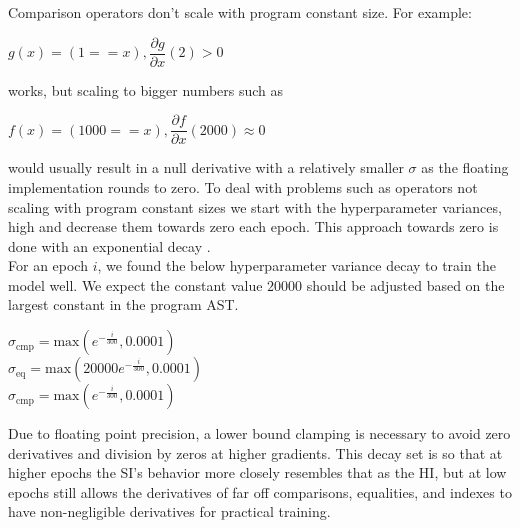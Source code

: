 \documentclass{article}
\begin{document}
Comparison operators don't scale with program constant size. For example:
\begin{center}
  $g(x) = (1 == x), \dfrac{\partial g}{\partial x} (2) > 0$
\end{center}
works, but scaling to bigger numbers such as
\begin{center}
  $f(x) = (1000 == x), \dfrac{\partial f}{\partial x} (2000) \approx 0$\\
\end{center}
would usually result in a null derivative with a relatively smaller $\sigma$ as the floating implementation rounds to zero. To deal with problems such as operators not scaling with program constant sizes we start with the hyperparameter variances, high and decrease them towards zero each epoch. This approach towards zero is done with an exponential decay \cite{DBLP:journals/corr/abs-1910-07454}.\\


For an epoch $i$, we found the below hyperparameter variance decay to train the model well. We expect the constant value $20000$ should be adjusted based on the largest constant in the program AST.
\begin{center}
  $\sigma_{\text{cmp}} = \text{max}(e^{-\frac{i}{300}}, 0.0001)$\\
  $\sigma_{\text{eq}} = \text{max}(20000e^{-\frac{i}{300}}, 0.0001)$\\
  $\sigma_{\text{cmp}} = \text{max}(e^{-\frac{i}{300}}, 0.0001)$\\
\end{center}
Due to floating point precision, a lower bound clamping is necessary to avoid zero derivatives and division by zeros at higher gradients. This decay set is so that at higher epochs the SI's behavior more closely resembles that as the HI, but at low epochs still allows the derivatives of far off comparisons, equalities, and indexes to have non-negligible derivatives for practical training. 

\end{document}
